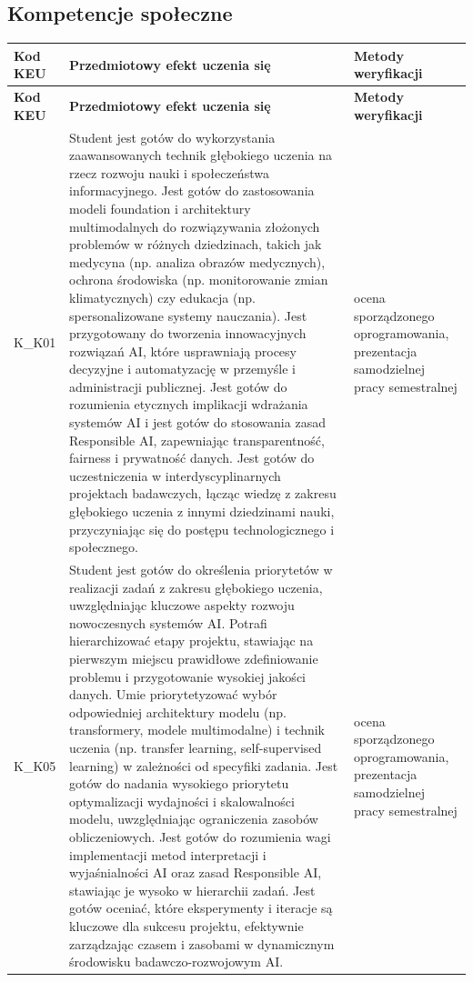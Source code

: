 \documentclass[12pt, a4paper]{article}
\newcommand{\thdrule}{\noalign{\global\setlength{\extrarowheight}{0pt}}}
\newcommand{\thdend}{\noalign{\global\setlength{\extrarowheight}{3pt}}}
\begin{document}
\subsection*{Kompetencje społeczne}
{\scriptsize
\begin{longtable}{m{1.6cm}m{9.0cm}m{4.2cm}}
\thdrule\toprule
\rowcolor{pjatkRed} {\color{white}\footnotesize\textbf{\vphantom{Ag}Kod KEU}} & {\color{white}\footnotesize\textbf{\vphantom{Ag}Przedmiotowy efekt uczenia się}} & {\color{white}\footnotesize\textbf{\vphantom{Ag}Metody weryfikacji}} \\
\midrule\thdend
\endfirsthead
\thdrule\toprule
\rowcolor{pjatkRed} {\color{white}\footnotesize\textbf{\vphantom{Ag}Kod KEU}} & {\color{white}\footnotesize\textbf{\vphantom{Ag}Przedmiotowy efekt uczenia się}} & {\color{white}\footnotesize\textbf{\vphantom{Ag}Metody weryfikacji}} \\
\midrule\thdend
\endhead
  \rowcolor{tableRowLight} K\_K01 & Student jest gotów do wykorzystania zaawansowanych technik głębokiego uczenia na rzecz rozwoju nauki i społeczeństwa informacyjnego. Jest gotów do zastosowania modeli foundation i architektury multimodalnych do rozwiązywania złożonych problemów w różnych dziedzinach, takich jak medycyna (np. analiza obrazów medycznych), ochrona środowiska (np. monitorowanie zmian klimatycznych) czy edukacja (np. spersonalizowane systemy nauczania). Jest przygotowany do tworzenia innowacyjnych rozwiązań AI, które usprawniają procesy decyzyjne i automatyzację w przemyśle i administracji publicznej. Jest gotów do rozumienia etycznych implikacji wdrażania systemów AI i jest gotów do stosowania zasad Responsible AI, zapewniając transparentność, fairness i prywatność danych. Jest gotów do uczestniczenia w interdyscyplinarnych projektach badawczych, łącząc wiedzę z zakresu głębokiego uczenia z innymi dziedzinami nauki, przyczyniając się do postępu technologicznego i społecznego. & ocena sporządzonego oprogramowania, prezentacja samodzielnej pracy semestralnej \\
  \rowcolor{tableRowAlt} K\_K05 & Student jest gotów do określenia priorytetów w realizacji zadań z zakresu głębokiego uczenia, uwzględniając kluczowe aspekty rozwoju nowoczesnych systemów AI. Potrafi hierarchizować etapy projektu, stawiając na pierwszym miejscu prawidłowe zdefiniowanie problemu i przygotowanie wysokiej jakości danych. Umie priorytetyzować wybór odpowiedniej architektury modelu (np. transformery, modele multimodalne) i technik uczenia (np. transfer learning, self-supervised learning) w zależności od specyfiki zadania. Jest gotów do nadania wysokiego priorytetu optymalizacji wydajności i skalowalności modelu, uwzględniając ograniczenia zasobów obliczeniowych. Jest gotów do rozumienia wagi implementacji metod interpretacji i wyjaśnialności AI oraz zasad Responsible AI, stawiając je wysoko w hierarchii zadań. Jest gotów oceniać, które eksperymenty i iteracje są kluczowe dla sukcesu projektu, efektywnie zarządzając czasem i zasobami w dynamicznym środowisku badawczo-rozwojowym AI. & ocena sporządzonego oprogramowania, prezentacja samodzielnej pracy semestralnej \\
\bottomrule
\end{longtable}}
\end{document}

